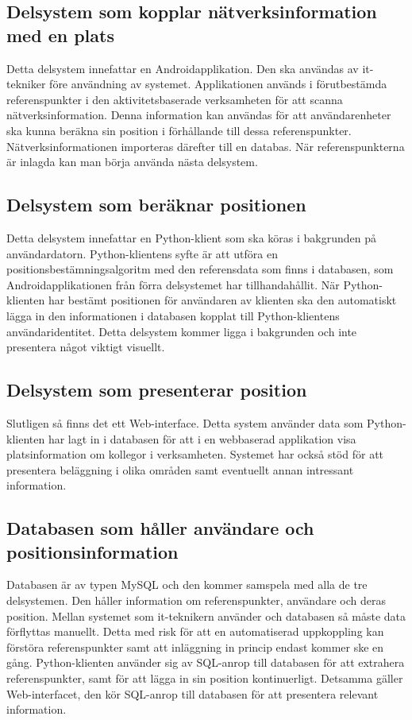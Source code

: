 \documentclass[swedish, a4paper,12pt]{article}
\begin{document}
\subsection{Delsystem som kopplar nätverksinformation med en plats}
Detta delsystem innefattar en Androidapplikation. Den ska användas av it-tekniker före användning av systemet. Applikationen används i förutbestämda referenspunkter i den aktivitetsbaserade verksamheten för att scanna nätverksinformation. Denna information kan användas för att användarenheter ska kunna beräkna sin position i förhållande till  dessa referenspunkter.  Nätverksinformationen importeras därefter till en databas. När referenspunkterna är inlagda kan man börja använda nästa delsystem.

\subsection{Delsystem som beräknar positionen}
Detta delsystem innefattar en Python-klient som ska köras i bakgrunden på användardatorn.
Python-klientens syfte är att utföra en positionsbestämningsalgoritm med den referensdata som finns i databasen, som Androidapplikationen från förra delsystemet har tillhandahållit. När Python-klienten har bestämt positionen för användaren av klienten ska den automatiskt lägga in den informationen i databasen kopplat till Python-klientens användaridentitet. Detta delsystem kommer ligga i bakgrunden och inte presentera något viktigt visuellt.

\subsection{Delsystem som presenterar position}
Slutligen så finns det ett Web-interface. Detta system använder data som Python-klienten har lagt in i databasen för att i en webbaserad applikation visa platsinformation om kollegor i verksamheten. Systemet har också stöd för att presentera beläggning i olika områden samt eventuellt annan intressant information.

\subsection{Databasen som håller användare och positionsinformation}
Databasen är av typen MySQL och den kommer samspela med alla de tre delsystemen. Den håller information om referenspunkter, användare och deras position.
Mellan systemet som it-teknikern använder och databasen så måste data förflyttas manuellt. Detta med risk för att en automatiserad uppkoppling kan förstöra referenspunkter samt att inläggning in princip endast kommer ske en gång. Python-klienten använder sig av SQL-anrop till databasen för att extrahera referenspunkter, samt för att lägga in sin position kontinuerligt. Detsamma gäller Web-interfacet, den kör SQL-anrop till databasen för att presentera relevant information.
\end{document}

